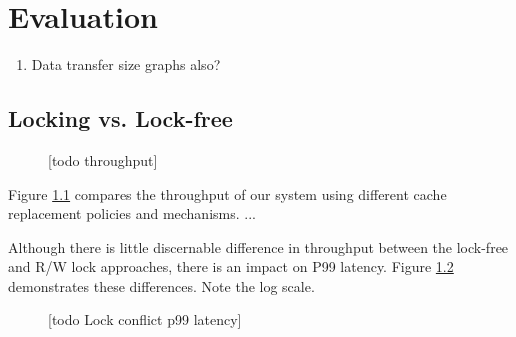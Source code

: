 \chapter{Evaluation} \label{Evaluation}




\begin{enumerate}
    \item Data transfer size graphs also?
\end{enumerate}

\section{Locking vs. Lock-free}

\begin{figure}[h!]
    \centering
    
    \caption{[todo throughput]}
    \label{Eval: Throughput}
\end{figure}    

Figure \ref{Eval: Throughput} compares the throughput of our system using different cache replacement policies and mechanisms.
...

Although there is little discernable difference in throughput between the lock-free and R/W lock approaches, there is an impact on P99 latency. Figure \ref{Eval: P99 latency} demonstrates these differences.
Note the log scale.

\begin{figure}[h!]
    \centering
    
    \caption{[todo Lock conflict p99 latency]}
    \label{Eval: P99 latency}
\end{figure}    

